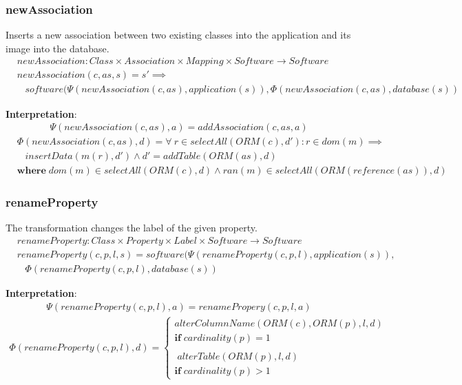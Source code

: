 \documentclass[10pt]{article}
\begin{document}
\subsubsection{newAssociation}
Inserts a new association between two existing classes into the application and its image into the database.
\begin{align}
& newAssociation: Class \times Association \times Mapping \times Software \rightarrow Software \\
& newAssociation(c, as, s) = s' \implies \nonumber \\ 
& \;\;\; software(\Psi(newAssociation(c, as), application(s)), \Phi(newAssociation(c, as), database(s))
\end{align}

\noindent \textbf{Interpretation}:
\begin{align}
\Psi(newAssociation(c, as), a) = addAssociation(c, as, a)
\end{align}
\begin{align}
& \Phi(newAssociation(c, as), d) = \forall \: r \in selectAll(ORM(c), d') : r \in dom(m) \implies \nonumber \\ & \;\;\; insertData(m(r), d') \land d' = addTable(ORM(as),  d) \nonumber \\
& \mathbf{where} \; dom(m) \in selectAll(ORM(c),d) \land ran(m) \in selectAll(ORM(reference(as)), d)
\end{align}


\subsubsection{renameProperty}
The transformation changes the label of the given property.
\begin{align}
& renameProperty: Class \times Property \times Label \times Software \rightarrow Software \nonumber \\
& renameProperty(c, p, l, s) = software(\Psi(renameProperty(c, p, l), application(s)),  \nonumber \\ 
& \;\;\; \Phi(renameProperty(c, p, l), database(s))
\end{align}

\noindent \textbf{Interpretation}:
\begin{align}
\Psi(renameProperty(c, p, l), a) = renamePropery(c, p, l, a) 
\end{align}
\begin{align}
\Phi(renameProperty(c, p, l), d) = \begin{cases}
  alterColumnName(ORM(c), ORM(p), l,  d) \\ \mathbf{if} \; cardinality(p) = 1  \\\\ 
  \; alterTable(ORM(p), l,  d) \\
  \mathbf{if} \; cardinality(p) > 1  
   \end{cases}
\end{align}
\end{document}
